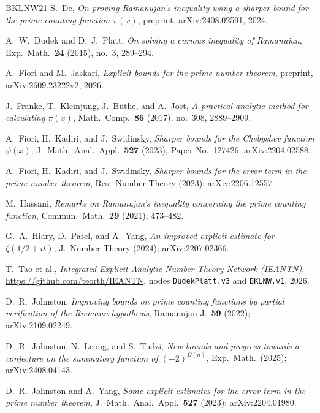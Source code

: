 \documentclass{amsart}
\theoremstyle{definition}
\theoremstyle{remark}
\theoremstyle{plain}
\numberwithin{equation}{section}
\begin{document}
\begin{thebibliography}{BKLNW21}
S.~De, \emph{On proving Ramanujan's inequality using a sharper bound for the prime counting function $\pi(x)$}, preprint, arXiv:2408.02591, 2024.

A.~W.~Dudek and D.~J.~Platt, \emph{On solving a curious inequality of Ramanujan}, Exp.\ Math.\ \textbf{24} (2015), no.~3, 289--294.

A.~Fiori and M.~Jaskari, \emph{Explicit bounds for the prime number theorem}, preprint, arXiv:2609.23222v2, 2026.

J.~Franke, T.~Kleinjung, J.~B\"uthe, and A.~Jost, \emph{A practical analytic method for calculating $\pi(x)$}, Math.\ Comp.\ \textbf{86} (2017), no.~308, 2889--2909.

A.~Fiori, H.~Kadiri, and J.~Swidinsky, \emph{Sharper bounds for the Chebyshev function $\psi(x)$}, J.\ Math.\ Anal.\ Appl.\ \textbf{527} (2023), Paper No.~127426; arXiv:2204.02588.

A.~Fiori, H.~Kadiri, and J.~Swidinsky, \emph{Sharper bounds for the error term in the prime number theorem}, Res.\ Number Theory (2023); arXiv:2206.12557.

M.~Hassani, \emph{Remarks on Ramanujan's inequality concerning the prime counting function}, Commun.\ Math.\ \textbf{29} (2021), 473--482.

G.~A.~Hiary, D.~Patel, and A.~Yang, \emph{An improved explicit estimate for $\zeta(1/2+it)$}, J.\ Number Theory (2024); arXiv:2207.02366.

T.~Tao et al., \emph{Integrated Explicit Analytic Number Theory Network (IEANTN)}, \url{https://github.com/teorth/IEANTN}, nodes \texttt{DudekPlatt.v3} and \texttt{BKLNW.v1}, 2026.

D.~R.~Johnston, \emph{Improving bounds on prime counting functions by partial verification of the Riemann hypothesis}, Ramanujan J.\ \textbf{59} (2022); arXiv:2109.02249.

D.~R.~Johnston, N.~Leong, and S.~Tudzi, \emph{New bounds and progress towards a conjecture on the summatory function of $(-2)^{\Omega(n)}$}, Exp.\ Math.\ (2025); arXiv:2408.04143.

D.~R.~Johnston and A.~Yang, \emph{Some explicit estimates for the error term in the prime number theorem}, J.\ Math.\ Anal.\ Appl.\ \textbf{527} (2023); arXiv:2204.01980.


\end{thebibliography}
\end{document}
